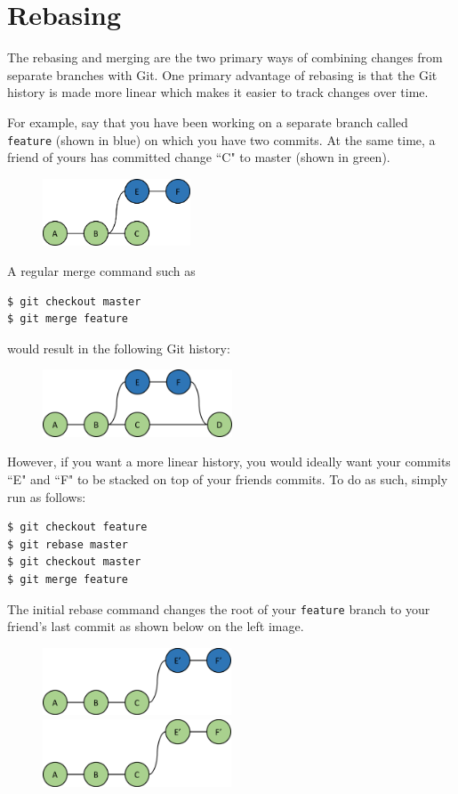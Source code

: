 \documentclass{amsart}
\begin{document}
\newpage
\section*{Rebasing}

The rebasing and merging are the two primary ways of combining changes from separate branches with Git.  One primary advantage of rebasing is that the Git history is made more linear which makes it easier to track changes over time.

For example, say that you have been working on a separate branch called \texttt{feature} (shown in blue) on which you have two commits.  At the same time, a friend of yours has committed change ``C" to master (shown in green).

\begin{figure}[h]
\center
\includegraphics[height=2cm]{feature}
\end{figure}

A regular merge command such as
\begin{verbatim}
$ git checkout master
$ git merge feature
\end{verbatim}
would result in the following Git history:
\begin{figure}[h]
\center
\includegraphics[height=2cm]{merge}
\end{figure}

However, if you want a more linear history, you would ideally want your commits ``E" and ``F" to be stacked on top of your friends commits.  To do as such, simply run as follows:
\begin{verbatim}
$ git checkout feature
$ git rebase master
$ git checkout master
$ git merge feature
\end{verbatim}

The initial rebase command changes the root of your \texttt{feature} branch to your friend's last commit as shown below on the left image.

\begin{figure}[h]
\center
\includegraphics[height=2cm]{rebase}
\includegraphics[height=2cm]{rebase_merge}
\end{figure}
\end{document}

